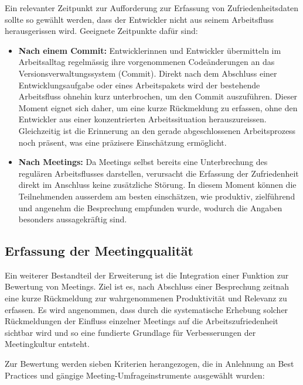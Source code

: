 \documentclass[12pt,a4paper]{report}
\begin{document}
Ein relevanter Zeitpunkt zur Aufforderung zur Erfassung von Zufriedenheitsdaten sollte so gewählt werden, dass der Entwickler
nicht aus seinem Arbeitsfluss herausgerissen wird. Geeignete Zeitpunkte dafür sind:

\begin{itemize}
  \item \textbf{Nach einem Commit:} Entwicklerinnen und Entwickler übermitteln im Arbeitsalltag regelmässig ihre vorgenommenen
    Codeänderungen an das Versionsverwaltungssystem (Commit). Direkt nach dem Abschluss einer Entwicklungsaufgabe oder eines
    Arbeitspakets wird der bestehende Arbeitsfluss ohnehin kurz unterbrochen, um den Commit auszuführen. Dieser Moment eignet sich
    daher, um eine kurze Rückmeldung zu erfassen, ohne den Entwickler aus einer konzentrierten Arbeitssituation herauszureissen.
    Gleichzeitig ist die Erinnerung an den gerade abgeschlossenen Arbeitsprozess noch präsent, was eine präzisere Einschätzung
    ermöglicht.

  \item \textbf{Nach Meetings:} Da Meetings selbst bereits eine Unterbrechung des regulären Arbeitsflusses darstellen, verursacht
    die Erfassung der Zufriedenheit direkt im Anschluss keine zusätzliche Störung. In diesem Moment können die Teilnehmenden
    ausserdem am besten einschätzen, wie produktiv, zielführend und angenehm die Besprechung empfunden wurde, wodurch die Angaben
    besonders aussagekräftig sind.
\end{itemize}

\subsection{Erfassung der Meetingqualität}

Ein weiterer Bestandteil der Erweiterung ist die Integration einer Funktion zur Bewertung von Meetings. Ziel ist es, nach
Abschluss einer Besprechung zeitnah eine kurze Rückmeldung zur wahrgenommenen Produktivität und Relevanz zu erfassen. Es wird
angenommen, dass durch die systematische Erhebung solcher Rückmeldungen der Einfluss einzelner Meetings auf die
Arbeitszufriedenheit sichtbar wird und so eine fundierte Grundlage für Verbesserungen der Meetingkultur entsteht.

Zur Bewertung werden sieben Kriterien herangezogen, die in Anlehnung an Best Practices und gängige Meeting-Umfrageinstrumente
ausgewählt wurden:
\end{document}
